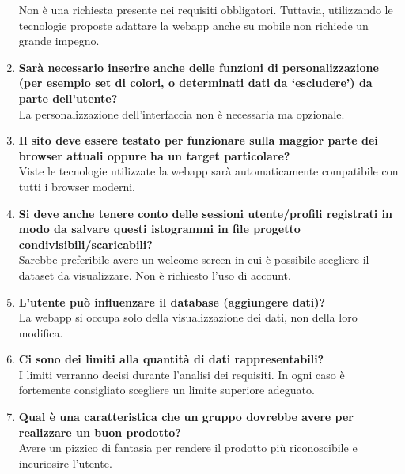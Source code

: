 \documentclass[10pt]{article}
\begin{document}
\begin{enumerate}
        Non è una richiesta presente nei requisiti obbligatori. Tuttavia, utilizzando le tecnologie proposte adattare la webapp anche su mobile non richiede un grande impegno.
    \item \textbf{Sarà necessario inserire anche delle funzioni di personalizzazione (per esempio set di colori, o determinati dati da ‘escludere’) da parte dell’utente?} \\
        La personalizzazione dell'interfaccia non è necessaria ma opzionale.
    \item \textbf{Il sito deve essere testato per funzionare sulla maggior parte dei browser attuali oppure ha un target particolare?} \\
        Viste le tecnologie utilizzate la webapp sarà automaticamente compatibile con tutti i browser moderni.
    \item \textbf{Si deve anche tenere conto delle sessioni utente/profili registrati in modo da salvare questi istogrammi in file progetto condivisibili/scaricabili?} \\
        Sarebbe preferibile avere un welcome screen in cui è possibile scegliere il dataset da visualizzare. Non è richiesto l'uso di account.
    \item \textbf{L’utente può influenzare il database (aggiungere dati)?} \\
        La webapp si occupa solo della visualizzazione dei dati, non della loro modifica.
    \item \textbf{Ci sono dei limiti alla quantità di dati rappresentabili?} \\
        I limiti verranno decisi durante l'analisi dei requisiti. In ogni caso è fortemente consigliato scegliere un limite superiore adeguato.
    \item \textbf{Qual è una caratteristica che un gruppo dovrebbe avere per realizzare un buon prodotto?}\\
        Avere un pizzico di fantasia per rendere il prodotto più riconoscibile e incuriosire l'utente.
\end{enumerate}
\end{document}
